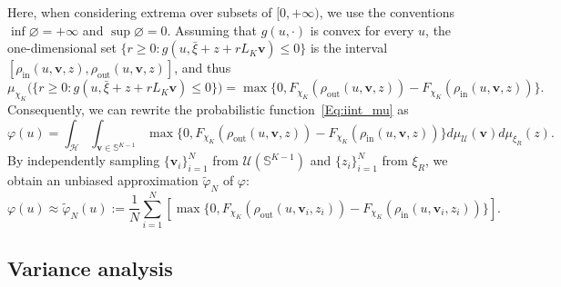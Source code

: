 \documentclass[%
onefignum,onetabnum]{siamonline250211}
\newcommand{\bbS}{\mathbb S}
\newcommand{\cU}{\mathcal U} \newcommand{\cV}{\mathcal V}
\begin{document}
Here, when considering extrema over subsets of $[0,+\infty)$, we use the conventions $\inf{\varnothing}=+\infty$ and $\sup{\varnothing}=0$. Assuming that $g(u,\cdot)$ is convex for every $u$, the one-dimensional set $\{r\geq 0: g(u,\bar{\xi}+z+r L_K\boldsymbol{v})\leq 0\}$ is the interval $[\rho_{\mathrm{in}}(u,\boldsymbol{v},z),\rho_{\mathrm{out}}(u,\boldsymbol{v},z)]$, and thus
\begin{equation*}
    \mu_{\chi_K}\big(\{r\geq 0: g(u,\bar{\xi}+z+r L_K\boldsymbol{v})\leq 0\}\big) = \max{\{0,F_{\!\chi_K}(\rho_{\mathrm{out}}(u,\boldsymbol{v},z))\!-\!F_{\!\chi_K}(\rho_{\mathrm{in}}(u,\boldsymbol{v},z))\}}.
\end{equation*}
Consequently, we can rewrite the probabilistic function~\eqref{Eq:iint_mu} as
\begin{equation*}
    \varphi(u)=\int_{\mathscr{H}}\int_{\boldsymbol{v}\in\bbS^{K-1}}\max{\{0, F_{\chi_K}(\rho_{\mathrm{out}}(u,\boldsymbol{v},z))-F_{\chi_K}(\rho_{\mathrm{in}}(u,\boldsymbol{v},z))\}}d\mu_{\cU} (\boldsymbol{v})d\mu_{\xi_R}(z).
\end{equation*}
By independently sampling $\{\boldsymbol{v}_i\}_{i=1}^N$ from $\cU(\bbS^{K-1})$ and $\{z_i\}_{i=1}^N$ from $\xi_R$, we obtain an unbiased approximation $\tilde{\varphi}_N$ of $\varphi$:
\begin{equation}\label{Eq:phi_u_dis}
    \varphi(u)\approx \tilde{\varphi}_N(u):=\frac{1}{N}\sum_{i=1}^N \left[ \max{\{0, F_{\chi_K}(\rho_{\mathrm{out}}(u,\boldsymbol{v}_i,z_i))-F_{\chi_K}(\rho_{\mathrm{in}}(u,\boldsymbol{v}_i,z_i))\}} \right].
\end{equation}

\subsection{Variance analysis}\label{subsec:variance-analysis}
\end{document}

